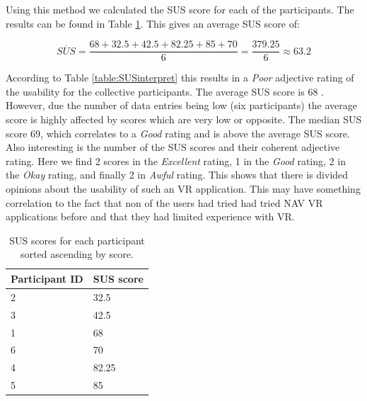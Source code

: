 Using this method we calculated the SUS score for each of the participants. The results can be found in Table \ref{table:SUSscores}. This gives an average SUS score of: 

\[\overline{SUS} = \frac{68 + 32.5 + 42.5 + 82.25 + 85 + 70}{6} = \frac{379.25}{6} \approx 63.2\]

According to Table \ref{table:SUSinterpret} this results in a \textit{Poor} adjective rating of the usability for the collective participants. The average SUS score is 68 \cite{SusMeasuringInterpret}. However, due the number of data entries being low (six participants) the average score is highly affected by scores which are very low or opposite. The median SUS score 69, which correlates to a \textit{Good} rating and is above the average SUS score. Also interesting is the number of the SUS scores and their coherent adjective rating. Here we find 2 scores in the \textit{Excellent} rating, 1 in the \textit{Good} rating, 2 in the \textit{Okay} rating, and finally 2 in \textit{Awful} rating. This shows that there is divided opinions about the usability of such an VR application. This may have something correlation to the fact that non of the users had tried had tried NAV VR applications before and that they had limited experience with VR. 




\begin{table}[H]
\centering
\begin{tabular}{l|l}
{ \textbf{Participant ID}} & { \textbf{SUS score}} \\ \hline
2   & 32.5                                     \\ 
3   & 42.5                                    \\ 
1   & 68                                   \\ 
6   & 70                                     \\ 
4   & 82.25                                    \\ 
5   & 85                                     \\ 
\end{tabular}
\caption{SUS scores for each participant sorted ascending by score.}
\label{table:SUSscores}
\end{table}



